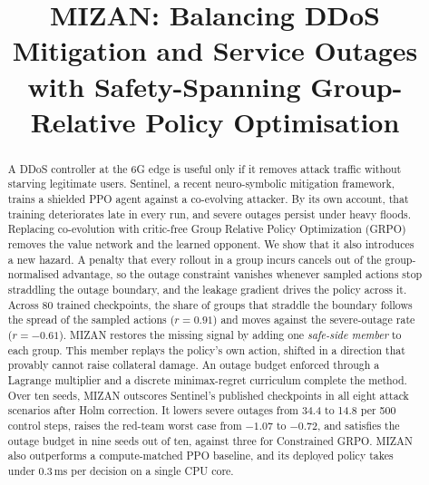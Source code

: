 \documentclass[conference]{IEEEtran}
\begin{document}
\title{MIZAN: Balancing DDoS Mitigation and Service Outages with Safety-Spanning Group-Relative Policy Optimisation}

\author{
}

\maketitle

\begin{abstract}
A DDoS controller at the 6G edge is useful only if it removes attack traffic without starving legitimate users. Sentinel, a recent neuro-symbolic mitigation framework, trains a shielded PPO agent against a co-evolving attacker. By its own account, that training deteriorates late in every run, and severe outages persist under heavy floods. Replacing co-evolution with critic-free Group Relative Policy Optimization (GRPO) removes the value network and the learned opponent. We show that it also introduces a new hazard. A penalty that every rollout in a group incurs cancels out of the group-normalised advantage, so the outage constraint vanishes whenever sampled actions stop straddling the outage boundary, and the leakage gradient drives the policy across it. Across 80 trained checkpoints, the share of groups that straddle the boundary follows the spread of the sampled actions ($r=0.91$) and moves against the severe-outage rate ($r=-0.61$). MIZAN restores the missing signal by adding one \emph{safe-side member} to each group. This member replays the policy's own action, shifted in a direction that provably cannot raise collateral damage. An outage budget enforced through a Lagrange multiplier and a discrete minimax-regret curriculum complete the method. Over ten seeds, MIZAN outscores Sentinel's published checkpoints in all eight attack scenarios after Holm correction. It lowers severe outages from 34.4 to 14.8 per 500 control steps, raises the red-team worst case from $-1.07$ to $-0.72$, and satisfies the outage budget in nine seeds out of ten, against three for Constrained GRPO. MIZAN also outperforms a compute-matched PPO baseline, and its deployed policy takes under 0.3\,ms per decision on a single CPU core.
\end{abstract}
\end{document}
